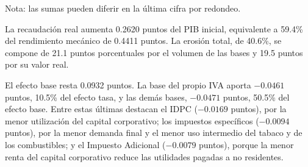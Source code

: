 \documentclass[11pt]{article}
\begin{document}
\begin{table}[H]
\centering
\caption{Recaudación y descomposición del impacto fiscal del incremento del IVA (porcentaje y puntos del PIB nominal inicial)}
\label{tab:iva-descomposicion}
\small
{}
\par\smallskip
\begin{minipage}{\textwidth}
\footnotesize Nota: las sumas pueden diferir en la última cifra por redondeo.
\end{minipage}
\end{table}

La recaudación real aumenta 0.2620 puntos del PIB inicial, equivalente a 59.4\% del rendimiento mecánico de 0.4411 puntos. La erosión total, de 40.6\%, se compone de 21.1 puntos porcentuales por el volumen de las bases y 19.5 puntos por su valor real.

El efecto base resta 0.0932 puntos. La base del propio IVA aporta $-0.0461$ puntos, 10.5\% del efecto tasa, y las demás bases, $-0.0471$ puntos, 50.5\% del efecto base. Entre estas últimas destacan el IDPC ($-0.0169$ puntos), por la menor utilización del capital corporativo; los impuestos específicos ($-0.0094$ puntos), por la menor demanda final y el menor uso intermedio del tabaco y de los combustibles; y el Impuesto Adicional ($-0.0079$ puntos), porque la menor renta del capital corporativo reduce las utilidades pagadas a no residentes.
\end{document}
